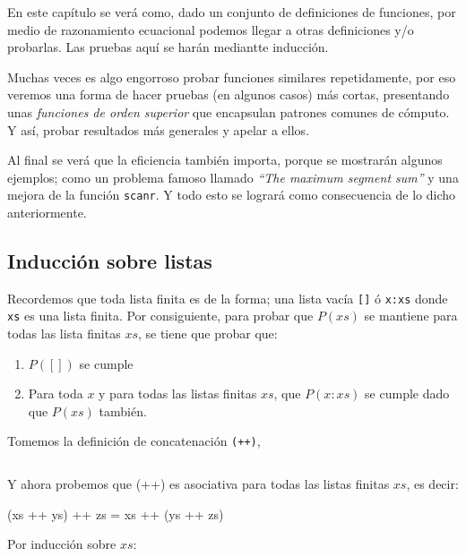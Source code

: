 En este capítulo se verá como, dado un conjunto de definiciones de funciones, por medio de razonamiento ecuacional podemos llegar a otras definiciones y/o probarlas. Las pruebas aquí se harán mediantte inducción.

Muchas veces es algo engorroso probar funciones similares repetidamente, por eso veremos una forma de hacer pruebas (en algunos casos) más cortas,
presentando unas \textit{funciones de orden superior} que encapsulan patrones comunes de cómputo. Y así, probar resultados más generales y apelar a ellos.

Al final se verá que la eficiencia también importa, porque se mostrarán algunos ejemplos; como un problema famoso llamado \textit{``The maximum segment sum''}
y una mejora de la función \texttt{scanr}. Y todo esto se logrará como consecuencia de lo dicho anteriormente.

\subsection{Inducción sobre listas}
Recordemos que toda lista finita es de la forma; una lista vacía \texttt{[]} ó \texttt{x:xs} donde \texttt{xs} es una lista finita. Por consiguiente, para probar que $P(xs)$ se mantiene para todas las lista finitas $xs$,
se tiene que probar que:

\begin{enumerate}
    \item $P([])$ se cumple
    \item Para toda $x$ y para todas las listas finitas $xs$, que $P(x:xs)$ se cumple dado que $P(xs)$ también.
\end{enumerate}

Tomemos la definición de concatenación \texttt{(++)},
\inputminted{haskell}{definiciones/concatenation.hs}

Y ahora probemos que (++) es asociativa para todas las listas finitas $xs$, es decir:

(xs ++ ys) ++ zs = xs ++ (ys ++ zs)

Por inducción sobre $xs$:


